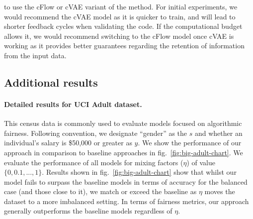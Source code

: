 to use the cFlow or cVAE variant of the method.
For initial experiments, we would recommend the cVAE model as it is quicker to train,
and will lead to shorter feedback cycles when validating the code.
If the computational budget allows it,
we would recommend switching to the cFlow model once cVAE is working
as it provides better guarantees regarding the retention of information from the input data.

\subsection{Additional results}\label{sec:additional-results}
\paragraph{Detailed results for UCI Adult dataset.}
This census data is commonly used to evaluate models focused on algorithmic fairness.
Following convention, we designate ``gender'' as the $s$ and whether an individual's salary is \$50,000 or greater as $y$.
We show the performance of our approach in comparison to baseline approaches in fig.~\ref{fig:big-adult-chart}.
We evaluate the performance of all models for mixing factors ($\eta$) of value $\{0, 0.1, ..., 1\}$. 
Results shown in fig.~\ref{fig:big-adult-chart} show that whilst our model fails to surpass the baseline models in terms of accuracy for the balanced case (and those close to it), we match or exceed the baseline as $\eta $ moves the dataset to a more imbalanced setting. In terms of fairness metrics,  our approach generally outperforms the baseline models regardless of $\eta$.

